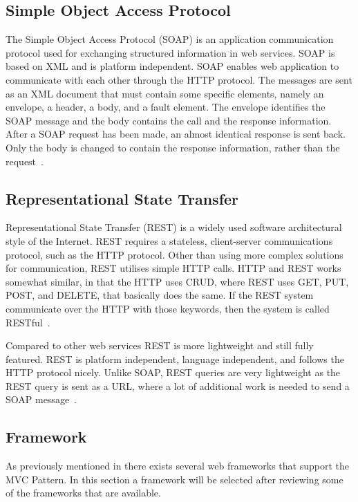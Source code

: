 \subsection{Simple Object Access Protocol}
The Simple Object Access Protocol (SOAP) is an application communication protocol used for exchanging structured information in web services. SOAP is based on XML and is platform independent. SOAP enables web application to communicate with each other through the HTTP protocol. The messages are sent as an XML document that must contain some specific elements, namely an envelope, a header, a body, and a fault element. The envelope identifies the SOAP message and the body contains the call and the response information. After a SOAP request has been made, an almost identical response is sent back. Only the body is changed to contain the response information, rather than the request~\citep{soap-w3school}. 

\subsection{Representational State Transfer}
Representational State Transfer (REST) is a widely used software architectural style of the Internet. REST requires a stateless, client-server communications protocol, such as the HTTP protocol. Other than using more complex solutions for communication, REST utilises simple HTTP calls. HTTP and REST works somewhat similar, in that the HTTP uses CRUD, where REST uses GET, PUT, POST, and DELETE, that basically does the same. If the REST system communicate over the HTTP with those keywords, then the system is called RESTful~\citep{rest-wikipedia}. 

Compared to other web services REST is more lightweight and still fully featured. REST is platform independent, language independent, and follows the HTTP protocol nicely. Unlike SOAP, REST queries are very lightweight as the REST query is sent as a URL, where a lot of additional work is needed to send a SOAP message~\citep{rest-elkstein}. 


\subsection{Framework}
As previously mentioned in  there exists several web frameworks that support the MVC Pattern. In this section a framework will be selected after reviewing some of the frameworks that are available. 



